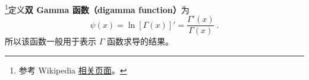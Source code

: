 
\begin{issues}
\issueDraft
\end{issues}


\footnote{参考 Wikipedia \href{https://en.wikipedia.org/wiki/Digamma_function}{相关页面}。}定义\textbf{双 Gamma 函数（digamma function）}为
\begin{equation}
\psi(x) = \ln[\Gamma(x)]' = \frac{\Gamma'(x)}{\Gamma(x)}~.
\end{equation}
所以该函数一般用于表示 $\Gamma$ 函数求导的结果。
